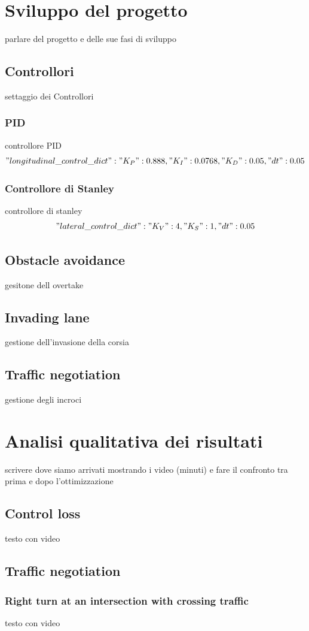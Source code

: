 \documentclass{article}
\begin{document}
\section{Sviluppo del progetto}
parlare del progetto e delle sue fasi di sviluppo 
\subsection{Controllori}
settaggio dei Controllori
\subsubsection{PID}
controllore PID
$$"longitudinal\_control\_dict" : {"K_P": 0.888 , "K_I": 0.0768, "K_D": 0.05, "dt": 0.05}$$
\subsubsection{Controllore di Stanley}
controllore di stanley
$$"lateral\_control\_dict" : {"K_V": 4, "K_S": 1, "dt": 0.05}$$
\subsection{Obstacle avoidance}
gesitone dell overtake
\subsection{Invading lane}
gestione dell'invasione della corsia
\subsection{Traffic negotiation}
gestione degli incroci


\section{Analisi qualitativa dei risultati}
scrivere dove siamo arrivati mostrando i video (minuti) e fare il confronto tra prima e dopo l'ottimizzazione
\subsection{Control loss}
testo con video

\subsection{Traffic negotiation}
\subsubsection{Right turn at an intersection with crossing traffic}
testo con video
\end{document}
